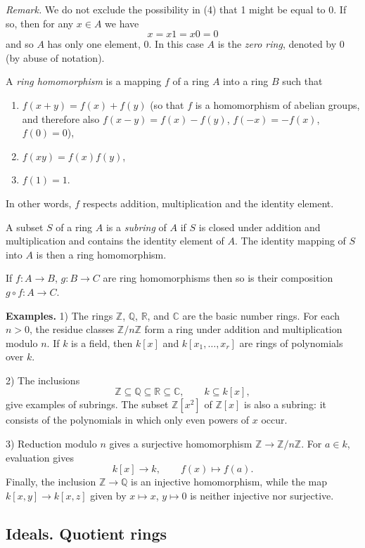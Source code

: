 \emph{Remark.}  We do not exclude the possibility in (4) that 1 might be equal to 0.
If so, then for any $x\in A$ we have
\[
x=x1=x0=0
\]
and so $A$ has only one element, 0.  In this case $A$ is the \emph{zero ring}, denoted by 0
(by abuse of notation).

A \emph{ring homomorphism} is a mapping $f$ of a ring $A$ into a ring $B$ such that
\begin{enumerate}
\renewcommand{\labelenumi}{\roman{enumi})}
\item $f(x+y)=f(x)+f(y)$ (so that $f$ is a homomorphism of abelian groups,
and therefore also $f(x-y)=f(x)-f(y)$, $f(-x)=-f(x)$, $f(0)=0$),
\item $f(xy)=f(x)f(y)$,
\item $f(1)=1$.
\end{enumerate}
In other words, $f$ respects addition, multiplication and the identity element.

A subset $S$ of a ring $A$ is a \emph{subring} of $A$ if $S$ is closed under addition and
multiplication and contains the identity element of $A$.  The identity mapping of
$S$ into $A$ is then a ring homomorphism.

If $f:A\longrightarrow B$, $g:B\longrightarrow C$ are ring homomorphisms then so is their composition
$g\circ f:A\longrightarrow C$.

\textline
\noindent\textbf{Examples.} 1) The rings $\mathbb Z$, $\mathbb Q$, $\mathbb R$,
and $\mathbb C$ are the basic number rings.  For each $n>0$, the residue classes
$\mathbb Z/n\mathbb Z$ form a ring under addition and multiplication modulo $n$.
If $k$ is a field, then $k[x]$ and $k[x_1,\ldots,x_r]$ are rings of
polynomials over $k$.

2) The inclusions
\[
\mathbb Z\subseteq\mathbb Q\subseteq\mathbb R\subseteq\mathbb C,
\qquad k\subseteq k[x],
\]
give examples of subrings.  The subset $\mathbb Z[x^2]$ of $\mathbb Z[x]$
is also a subring: it consists of the polynomials in which only even powers of
$x$ occur.

3) Reduction modulo $n$ gives a surjective homomorphism
$\mathbb Z\longrightarrow\mathbb Z/n\mathbb Z$.  For $a\in k$, evaluation gives
\[
k[x]\longrightarrow k,\qquad f(x)\longmapsto f(a).
\]
Finally, the inclusion $\mathbb Z\longrightarrow\mathbb Q$ is an injective
homomorphism, while the map $k[x,y]\longrightarrow k[x,z]$ given by
$x\mapsto x$, $y\mapsto0$ is neither injective nor surjective.
\textline

\subsection{Ideals. Quotient rings}

